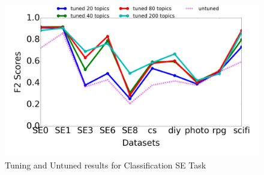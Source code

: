 \documentclass[twocolumn,5p,sort&compress]{elsarticle}
\theoremstyle{break}
\begin{document}
\begin{figure}[!htbp]
  \begin{center}
    \includegraphics[width=\linewidth]{./fig/classification.png}
    \end{center}
  \caption{Tuning and Untuned results for Classification SE Task}\label{fig:class}  
\end{figure}
\end{document}
